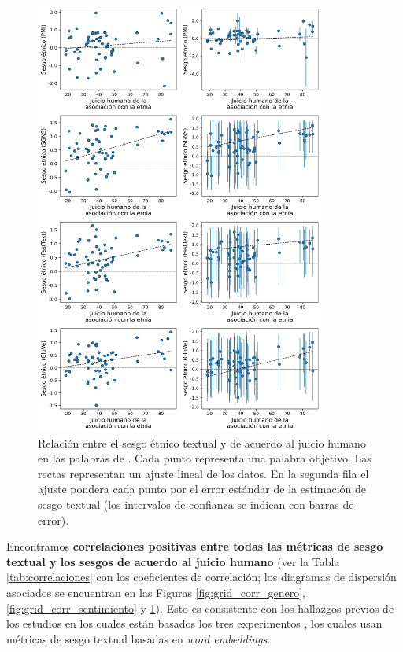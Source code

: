 \begin{figure}[H]
    \centering
    \includegraphics[width=0.85\textwidth]{img/grid_mturk-race.png}
    \caption{
        Relación entre el sesgo étnico textual y de acuerdo al juicio humano en las palabras de \citet{kozlowski2019geometry}. Cada punto representa una palabra objetivo. Las rectas representan un ajuste lineal de los datos. En la segunda fila el ajuste pondera cada punto por el error estándar de la estimación de sesgo textual (los intervalos de confianza se indican con barras de error).
    }
    \label{fig:grid_corr_etnico}
\end{figure}


Encontramos \textbf{correlaciones positivas entre todas las métricas de sesgo textual y los sesgos de acuerdo al juicio humano} (ver la Tabla \ref{tab:correlaciones} con los coeficientes de correlación; los diagramas de dispersión asociados se encuentran en las Figuras \ref{fig:grid_corr_genero}, \ref{fig:grid_corr_sentimiento} y \ref{fig:grid_corr_etnico}). Esto es consistente con los hallazgos previos de los estudios en los cuales están basados los tres experimentos \citep{lewis2020gender,kozlowski2019geometry,toney2021valnorm}, los cuales usan métricas de sesgo textual basadas en \emph{word embeddings}.

